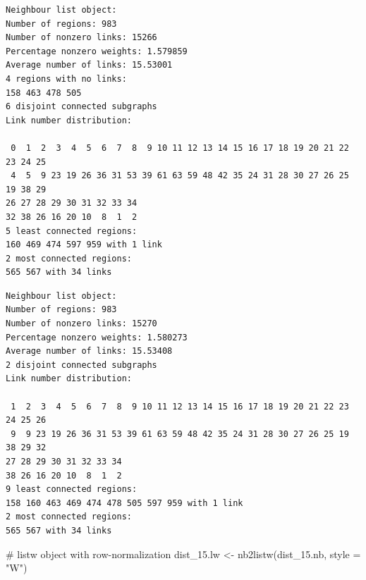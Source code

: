 \documentclass[
  letterpaper,
]{scrbook}
\newenvironment{Shaded}{\begin{snugshade}}{\end{snugshade}}
\newcommand{\AttributeTok}[1]{\textcolor[rgb]{0.40,0.45,0.13}{#1}}
\newcommand{\CommentTok}[1]{\textcolor[rgb]{0.37,0.37,0.37}{#1}}
\newcommand{\DecValTok}[1]{\textcolor[rgb]{0.68,0.00,0.00}{#1}}
\newcommand{\FunctionTok}[1]{\textcolor[rgb]{0.28,0.35,0.67}{#1}}
\newcommand{\NormalTok}[1]{\textcolor[rgb]{0.00,0.23,0.31}{#1}}
\newcommand{\OtherTok}[1]{\textcolor[rgb]{0.00,0.23,0.31}{#1}}
\newcommand{\SpecialCharTok}[1]{\textcolor[rgb]{0.37,0.37,0.37}{#1}}
\newcommand{\StringTok}[1]{\textcolor[rgb]{0.13,0.47,0.30}{#1}}
\begin{document}
\begin{verbatim}
Neighbour list object:
Number of regions: 983 
Number of nonzero links: 15266 
Percentage nonzero weights: 1.579859 
Average number of links: 15.53001 
4 regions with no links:
158 463 478 505
6 disjoint connected subgraphs
Link number distribution:

 0  1  2  3  4  5  6  7  8  9 10 11 12 13 14 15 16 17 18 19 20 21 22 23 24 25 
 4  5  9 23 19 26 36 31 53 39 61 63 59 48 42 35 24 31 28 30 27 26 25 19 38 29 
26 27 28 29 30 31 32 33 34 
32 38 26 16 20 10  8  1  2 
5 least connected regions:
160 469 474 597 959 with 1 link
2 most connected regions:
565 567 with 34 links
\end{verbatim}

\begin{Shaded}
\end{Shaded}

\begin{verbatim}
Neighbour list object:
Number of regions: 983 
Number of nonzero links: 15270 
Percentage nonzero weights: 1.580273 
Average number of links: 15.53408 
2 disjoint connected subgraphs
Link number distribution:

 1  2  3  4  5  6  7  8  9 10 11 12 13 14 15 16 17 18 19 20 21 22 23 24 25 26 
 9  9 23 19 26 36 31 53 39 61 63 59 48 42 35 24 31 28 30 27 26 25 19 38 29 32 
27 28 29 30 31 32 33 34 
38 26 16 20 10  8  1  2 
9 least connected regions:
158 160 463 469 474 478 505 597 959 with 1 link
2 most connected regions:
565 567 with 34 links
\end{verbatim}

\begin{Shaded}
\begin{Highlighting}[]
\CommentTok{\# listw object with row{-}normalization}
\NormalTok{dist\_15.lw }\OtherTok{\textless{}{-}} \FunctionTok{nb2listw}\NormalTok{(dist\_15.nb, }\AttributeTok{style =} \StringTok{"W"}\NormalTok{)}
\end{Highlighting}
\end{Shaded}
\end{document}
